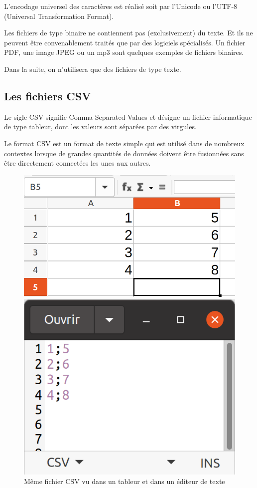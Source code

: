 L'encodage universel des caractères est réalisé soit par l'Unicode ou l'UTF-8 (Universal Transformation Format).

Les fichiers de type binaire ne contiennent pas (exclusivement) du texte. Et ils ne peuvent être convenablement traités que par des logiciels spécialisés. Un fichier PDF, une image JPEG ou un mp3 sont quelques exemples de fichiers binaires.

Dans la suite, on n'utilisera que des fichiers de type texte.

\subsection{Les fichiers CSV}

Le sigle CSV signifie Comma-Separated Values et désigne un fichier informatique de type tableur, dont les valeurs sont séparées par des virgules. 

Le format CSV est un format de texte simple qui est utilisé dans de nombreux contextes lorsque de grandes quantités de données doivent être fusionnées sans être directement connectées les unes aux autres.

\begin{figure}[ht!]
\begin{minipage}{0.45\linewidth}
\begin{center}
 \includegraphics[width=0.7\linewidth]{img/calc}
\end{center}
\end{minipage}\hfill
\begin{minipage}{0.45\linewidth}
\begin{center}
 \includegraphics[width=0.6\linewidth]{img/gedit}
\end{center}
\end{minipage}
\caption{Même fichier CSV vu dans un tableur et dans un éditeur de texte}
\end{figure}

